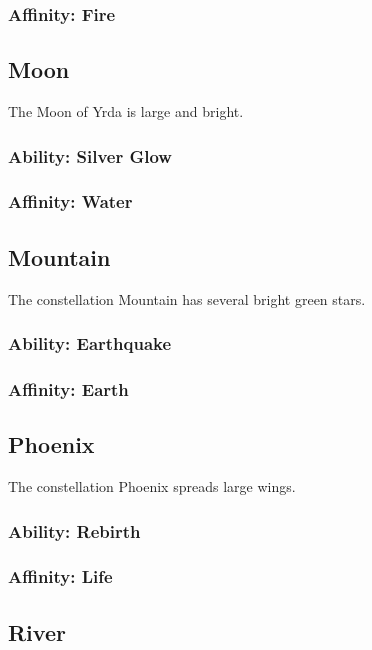 \begin{multicols}{2}
\subsubsection{Affinity: Fire}

\subsection{Moon}

The Moon of Yrda is large and bright.

\subsubsection{Ability: Silver Glow}

\subsubsection{Affinity: Water}

\subsection{Mountain}

The constellation Mountain has several bright green stars.

\subsubsection{Ability: Earthquake}

\subsubsection{Affinity: Earth}

\subsection{Phoenix}

The constellation Phoenix spreads large wings.

\subsubsection{Ability: Rebirth}

\subsubsection{Affinity: Life}

\subsection{River}


\end{multicols}
